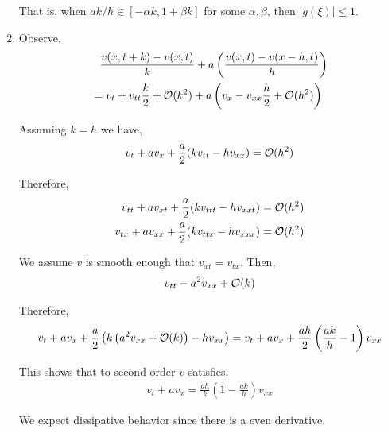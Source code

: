 \documentclass[10pt]{article}
\begin{document}
\begin{solution}[Solution]
\begin{enumerate}[label=(\alph*)]
        That is, when \( ak/h \in [-\alpha k,  1 + \beta k] \) for some \( \alpha, \beta \), then \( |g(\xi)| \leq 1 \).


    \item
        Observe,
        \begin{align*}
            &\phantom{=}\frac{v(x,t+k)-v(x,t)}{k} + a \left( \frac{v(x,t) - v(x-h,t)}{h} \right)
            \\&= v_t + v_{tt}\frac{k}{2} + \mathcal{O}(k^2) + a \left( v_x - v_{xx} \frac{h}{2} + \mathcal{O}(h^2)\right)
        \end{align*}
        
        Assuming \( k=h \) we have,
        \begin{align*}
            v_t + a v_x + \frac{a}{2} (k v_{tt} - hv_{xx}) = \mathcal{O}(h^2)
        \end{align*}

        Therefore,
        \begin{align*}
            v_{tt} + av_{xt} + \frac{a}{2} (k v_{ttt} - hv_{xxt} ) &= \mathcal{O}(h^2)
            \\ v_{tx} + a v_{xx} + \frac{a}{2} (kv_{ttx} - h v_{xxx}) &= \mathcal{O}(h^2)
        \end{align*}

        We assume \( v \) is smooth enough that \( v_{xt} = v_{tx} \). Then,
        \begin{align*}
            v_{tt} - a^2 v_{xx} + \mathcal{O}(k)
        \end{align*}
        
        Therefore,
        \begin{align*}
            v_t + av_x + \frac{a}{2} \left( k \left( a^2v_{xx} + \mathcal{O}(k) \right) - h v_{xx} \right)
            = v_t + av_x + \frac{ah}{2} \left( \frac{ak}{h}-1 \right)v_{xx}
        \end{align*}
        
        This shows that to second order \( v \) satisfies,
        \begin{align*}
            v_t + av_x = \frac{ah}{k} \left( 1-\frac{ak}{h} \right)v_{xx}
        \end{align*}
               

        We expect dissipative behavior since there is a even derivative.

\end{enumerate}

\end{solution}
\end{document}
